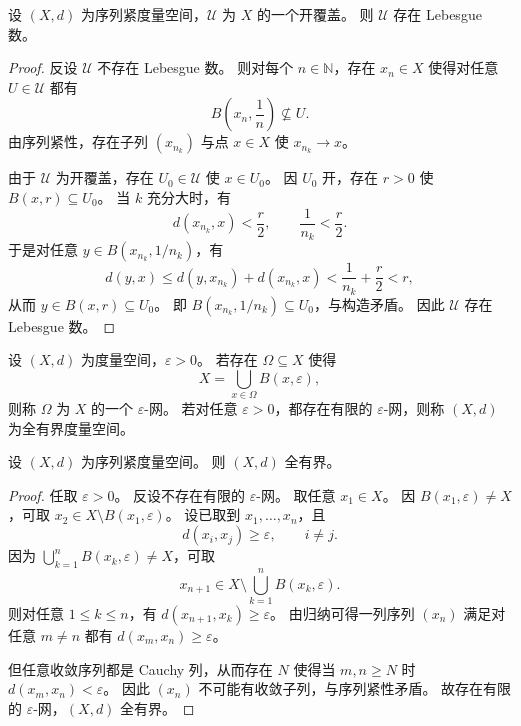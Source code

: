 \documentclass[lang=cn,a4paper,newtx,section]{elegantbook}
\begin{document}
\begin{theorem}\label{thm:lebesgue-number-sequentially-compact}
  设 $(X,d)$ 为序列紧度量空间，$\mathcal{U}$ 为 $X$ 的一个开覆盖。
  则 $\mathcal{U}$ 存在 Lebesgue 数。
\end{theorem}

\begin{proof}
  反设 $\mathcal{U}$ 不存在 Lebesgue 数。
  则对每个 $n\in\mathbb{N}$，存在 $x_n\in X$ 使得对任意 $U\in\mathcal{U}$ 都有
  \[
    B\left(x_n,\frac{1}{n}\right)\not\subseteq U.
  \]
  由序列紧性，存在子列 $(x_{n_k})$ 与点 $x\in X$ 使 $x_{n_k}\to x$。

  由于 $\mathcal{U}$ 为开覆盖，存在 $U_0\in\mathcal{U}$ 使 $x\in U_0$。
  因 $U_0$ 开，存在 $r>0$ 使 $B(x,r)\subseteq U_0$。
  当 $k$ 充分大时，有
  \[
    d(x_{n_k},x)<\frac{r}{2},\qquad \frac{1}{n_k}<\frac{r}{2}.
  \]
  于是对任意 $y\in B(x_{n_k},1/n_k)$，有
  \[
    d(y,x)\le d(y,x_{n_k})+d(x_{n_k},x)<\frac{1}{n_k}+\frac{r}{2}<r,
  \]
  从而 $y\in B(x,r)\subseteq U_0$。
  即 $B(x_{n_k},1/n_k)\subseteq U_0$，与构造矛盾。
  因此 $\mathcal{U}$ 存在 Lebesgue 数。
\end{proof}

\begin{definition}
  设 $(X,d)$ 为度量空间，$\varepsilon>0$。
  若存在 $\Omega\subseteq X$ 使得
  \[
    X=\bigcup_{x\in\Omega}B(x,\varepsilon),
  \]
  则称 $\Omega$ 为 $X$ 的一个 $\varepsilon$-网。
  若对任意 $\varepsilon>0$，都存在有限的 $\varepsilon$-网，则称 $(X,d)$ 为全有界度量空间。
\end{definition}

\begin{theorem}\label{thm:sequentially-compact-implies-totally-bounded}
  设 $(X,d)$ 为序列紧度量空间。
  则 $(X,d)$ 全有界。
\end{theorem}

\begin{proof}
  任取 $\varepsilon>0$。
  反设不存在有限的 $\varepsilon$-网。
  取任意 $x_1\in X$。
  因 $B(x_1,\varepsilon)\ne X$，可取 $x_2\in X\setminus B(x_1,\varepsilon)$。
  设已取到 $x_1,\dots,x_n$，且
  \[
    d(x_i,x_j)\ge\varepsilon,\qquad i\ne j.
  \]
  因为 $\bigcup_{k=1}^{n}B(x_k,\varepsilon)\ne X$，可取
  \[
    x_{n+1}\in X\setminus\bigcup_{k=1}^{n}B(x_k,\varepsilon).
  \]
  则对任意 $1\le k\le n$，有 $d(x_{n+1},x_k)\ge\varepsilon$。
  由归纳可得一列序列 $(x_n)$ 满足对任意 $m\ne n$ 都有 $d(x_m,x_n)\ge\varepsilon$。

  但任意收敛序列都是 Cauchy 列，从而存在 $N$ 使得当 $m,n\ge N$ 时 $d(x_m,x_n)<\varepsilon$。
  因此 $(x_n)$ 不可能有收敛子列，与序列紧性矛盾。
  故存在有限的 $\varepsilon$-网，$(X,d)$ 全有界。
\end{proof}
\end{document}
